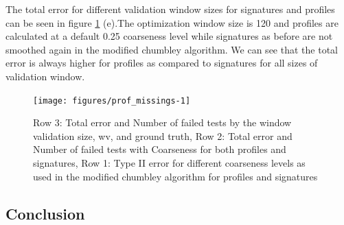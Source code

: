 \documentclass[12pt]{article}
\begin{document}
The total error for different validation window sizes for signatures and
profiles can be seen in figure \ref{fig:prof_missings} (e).The
optimization window size is 120 and profiles are calculated at a default
0.25 coarseness level while signatures as before are not smoothed again
in the modified chumbley algorithm. We can see that the total error is
always higher for profiles as compared to signatures for all sizes of
validation window.

\begin{figure}

{\centering \texttt{[image: figures/prof\_missings-1]} 

}

\caption{Row 3:  Total error and Number of failed tests by the window validation size, wv, and ground truth, Row 2: Total error and Number of failed tests with Coarseness for both profiles and signatures, Row 1: Type II error for different coarseness levels as used in the modified chumbley algorithm for profiles and signatures}\label{fig:prof_missings}
\end{figure}

\pagebreak

\subsection{Conclusion}\label{conclusion}
\end{document}
